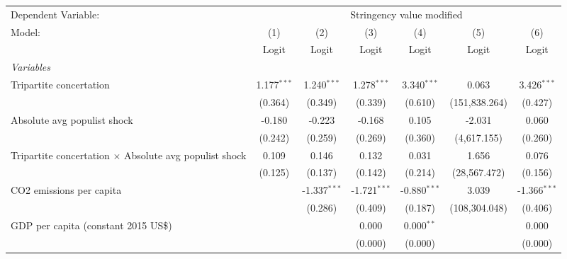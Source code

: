 
\begingroup
\centering
\begin{tabular}{lcccccc}
   \toprule
   Dependent Variable: & \multicolumn{6}{c}{Stringency value modified}\\
   Model:                                                        & (1)           & (2)            & (3)            & (4)            & (5)           & (6)\\  
                                                                 &  Logit        & Logit          & Logit          & Logit          & Logit         & Logit\\  
   \midrule
   \emph{Variables}\\
   Tripartite concertation                                       & 1.177$^{***}$ & 1.240$^{***}$  & 1.278$^{***}$  & 3.340$^{***}$  & 0.063         & 3.426$^{***}$\\   
                                                                 & (0.364)       & (0.349)        & (0.339)        & (0.610)        & (151,838.264) & (0.427)\\   
   Absolute avg populist shock                                   & -0.180        & -0.223         & -0.168         & 0.105          & -2.031        & 0.060\\   
                                                                 & (0.242)       & (0.259)        & (0.269)        & (0.360)        & (4,617.155)   & (0.260)\\   
   Tripartite concertation $\times$ Absolute avg populist shock  & 0.109         & 0.146          & 0.132          & 0.031          & 1.656         & 0.076\\   
                                                                 & (0.125)       & (0.137)        & (0.142)        & (0.214)        & (28,567.472)  & (0.156)\\   
   CO2 emissions per capita                                      &               & -1.337$^{***}$ & -1.721$^{***}$ & -0.880$^{***}$ & 3.039         & -1.366$^{***}$\\   
                                                                 &               & (0.286)        & (0.409)        & (0.187)        & (108,304.048) & (0.406)\\   
   GDP per capita (constant 2015 US\$)                           &               &                & 0.000          & 0.000$^{**}$   &               & 0.000\\   
                                                                 &               &                & (0.000)        & (0.000)        &               & (0.000)\\   

\end{tabular}
